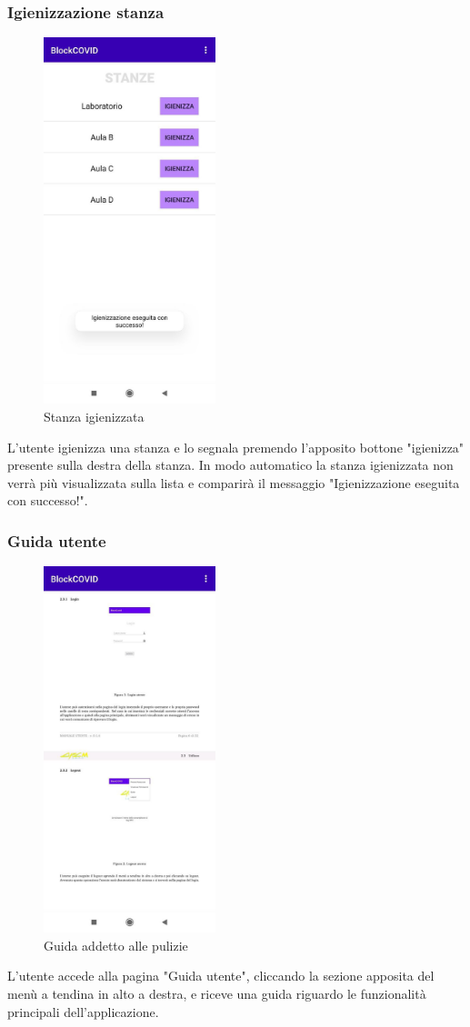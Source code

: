 	\subsubsection{Igienizzazione stanza}
	\begin{figure}[H]
		\centering
		\includegraphics[width=5cm]{res/images/igienizzazioneStanza.png}
		\caption{Stanza igienizzata}
	\end{figure}
	L'utente igienizza una stanza e lo segnala premendo l'apposito bottone "igienizza" presente sulla destra della stanza. In modo automatico la stanza igienizzata non verrà più visualizzata sulla lista e comparirà il messaggio "Igienizzazione eseguita con successo!".
	\subsubsection{Guida utente}
	\begin{figure}[H]
		\centering
		\includegraphics[width=5cm]{res/images/guidaAddetto.png}
		\caption{Guida addetto alle pulizie}
	\end{figure}
	L’utente accede alla pagina "Guida utente", cliccando la sezione apposita del menù a tendina in alto a destra, e riceve una guida riguardo le funzionalità principali dell'applicazione.
	
	 
	
	
